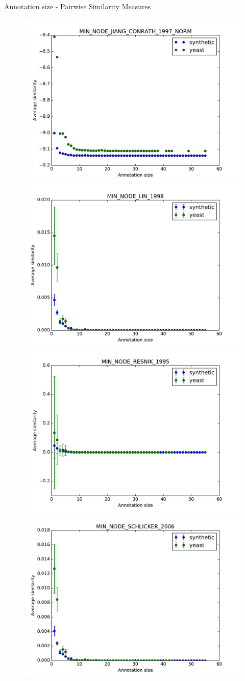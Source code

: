 \documentclass{beamer}
\begin{document}
\begin{frame}{Annotation size - Pairwise Similarity Measures}
\begin{figure}
\includegraphics[width=0.5\linewidth, height=0.4\textheight]{pairwise/SIM_GROUPWISE_MIN_SIM_PAIRWISE_DAG_NODE_JIANG_CONRATH_1997_NORM_avg.pdf}
\includegraphics[width=0.5\linewidth, height=0.4\textheight]{pairwise/SIM_GROUPWISE_MIN_SIM_PAIRWISE_DAG_NODE_LIN_1998_avg.pdf} \\
\includegraphics[width=0.5\linewidth, height=0.4\textheight]{pairwise/SIM_GROUPWISE_MIN_SIM_PAIRWISE_DAG_NODE_RESNIK_1995_avg.pdf}
\includegraphics[width=0.5\linewidth, height=0.4\textheight]{pairwise/SIM_GROUPWISE_MIN_SIM_PAIRWISE_DAG_NODE_SCHLICKER_2006_avg.pdf}
\end{figure}
\end{frame}
\end{document}
